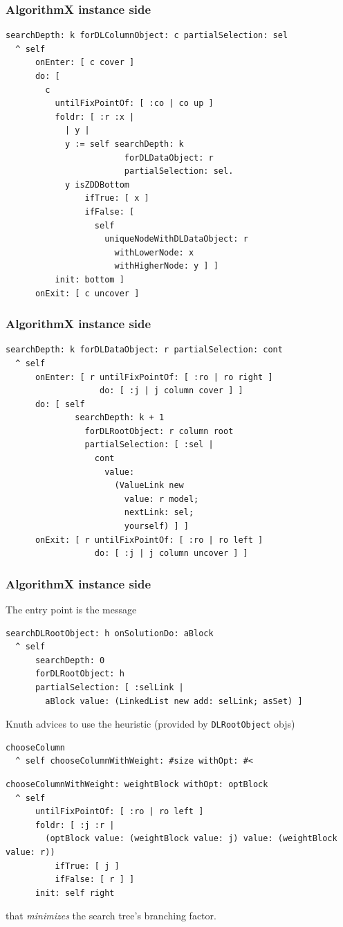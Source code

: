 \documentclass[10pt]{beamer}
\begin{document}
\begin{frame}[fragile]
\frametitle{AlgorithmX instance side}
\begin{verbatim}
searchDepth: k forDLColumnObject: c partialSelection: sel
  ^ self
      onEnter: [ c cover ]
      do: [ 
        c
          untilFixPointOf: [ :co | co up ]
          foldr: [ :r :x | 
            | y |
            y := self searchDepth: k 
                        forDLDataObject: r 
                        partialSelection: sel.
            y isZDDBottom
                ifTrue: [ x ]
                ifFalse: [ 
                  self
                    uniqueNodeWithDLDataObject: r
                      withLowerNode: x
                      withHigherNode: y ] ]
          init: bottom ]
      onExit: [ c uncover ]
\end{verbatim}
\end{frame}

\begin{frame}[fragile]
\frametitle{AlgorithmX instance side}
\begin{verbatim}
searchDepth: k forDLDataObject: r partialSelection: cont
  ^ self
      onEnter: [ r untilFixPointOf: [ :ro | ro right ] 
                   do: [ :j | j column cover ] ]
      do: [ self
              searchDepth: k + 1
                forDLRootObject: r column root
                partialSelection: [ :sel | 
                  cont
                    value:
                      (ValueLink new
                        value: r model;
                        nextLink: sel;
                        yourself) ] ]
      onExit: [ r untilFixPointOf: [ :ro | ro left ] 
                  do: [ :j | j column uncover ] ]
\end{verbatim}
\end{frame}

\begin{frame}[fragile]
\frametitle{AlgorithmX instance side}
The entry point is the message
\vfill
\begin{verbatim}
searchDLRootObject: h onSolutionDo: aBlock
  ^ self
      searchDepth: 0
      forDLRootObject: h
      partialSelection: [ :selLink | 
        aBlock value: (LinkedList new add: selLink; asSet) ]
\end{verbatim}
\vfill
Knuth advices to use the heuristic (provided by \texttt{DLRootObject} objs)
\begin{verbatim}
chooseColumn
  ^ self chooseColumnWithWeight: #size withOpt: #<
\end{verbatim}
\begin{verbatim}
chooseColumnWithWeight: weightBlock withOpt: optBlock
  ^ self
      untilFixPointOf: [ :ro | ro left ]
      foldr: [ :j :r | 
        (optBlock value: (weightBlock value: j) value: (weightBlock value: r))
          ifTrue: [ j ]
          ifFalse: [ r ] ]
      init: self right
\end{verbatim}
that \textit{minimizes} the search tree's branching factor.
\end{frame}
\end{document}
